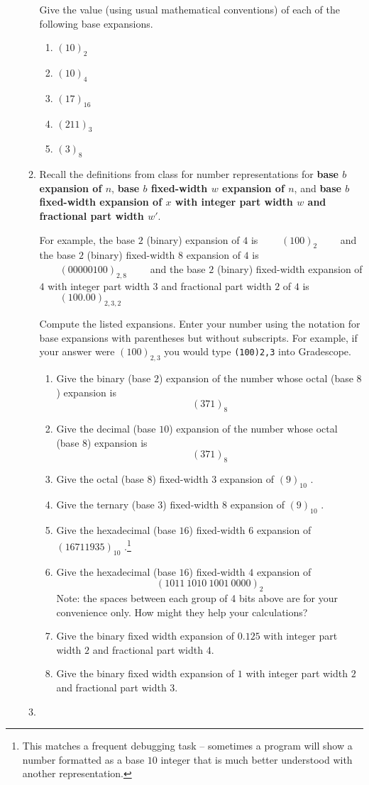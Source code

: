 \documentclass[12pt, oneside]{article}
\begin{document}
\begin{enumerate}
\begin{enumerate}
{Give the value (using usual mathematical conventions) of 
each of the following base expansions.
\begin{enumerate}
    \item $(10)_{2}$
    \item $(10)_{4}$
    \item $(17)_{16}$
    \item $(211)_{3}$
    \item $(3)_{8}$
\end{enumerate} }
    \item {

Recall the definitions from class for number representations for {\bf base $b$ expansion of $n$},
{\bf  base $b$ fixed-width $w$ expansion of $n$}, and {\bf base $b$ fixed-width expansion of $x$ 
with integer part width $w$ and fractional part width $w'$}.

For example, the base $2$ (binary) expansion of $4$ is 
$\qquad
(100)_2 \qquad$
and the base $2$ (binary) fixed-width $8$ expansion of $4$ is
$\qquad
(00000100)_{2,8} \qquad$
and the base $2$ (binary) fixed-width expansion of $4$ with integer part width $3$ and fractional
part width $2$ of $4$ is
$\qquad
(100.00)_{2,3,2} \qquad$

Compute the listed expansions.  Enter your number using the notation for base 
expansions with parentheses but without subscripts. For example, 
if your answer were $(100)_{2,3}$
you would type \texttt{(100)2,3} into Gradescope.

\begin{enumerate}
\item Give the binary (base $2$) expansion of the number whose octal (base $8$) expansion is
\[
(371)_8
\]
\item Give the decimal (base $10$) expansion of the number whose octal (base $8$) expansion is
\[
(371)_8
\]
\item Give the octal (base $8$) fixed-width $3$ expansion of $(9)_{10}$ .
\item Give the ternary (base $3$) fixed-width $8$ expansion of $(9)_{10}$ .
\item Give the hexadecimal (base $16$) fixed-width $6$ expansion of
$(16711935)_{10}$ .\footnote{This matches a frequent debugging task --
sometimes a program will show a number formatted as a base $10$
integer that is much better understood with another representation.}
\item Give the hexadecimal (base $16$) fixed-width $4$ expansion of
$$(1011~ 1010 ~ 1001~ 0000 )_2$$
Note: the spaces between each group of 4 bits above are for your convenience only.  How
might they help your calculations?
\item Give the binary fixed width expansion of $0.125$ with integer part width $2$ and 
fractional part width $4$.
\item Give the binary fixed width expansion of $1$ with integer part width $2$ and 
fractional part width $3$.
\end{enumerate} }
    \item {

}
\end{enumerate}
\end{enumerate}
\end{document}
